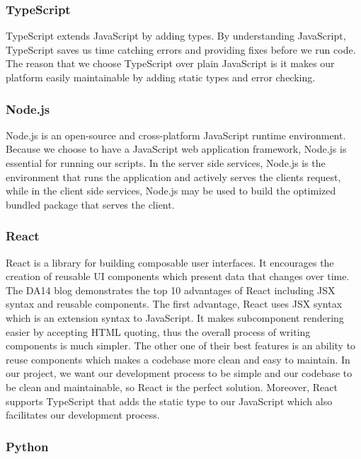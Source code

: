 \documentclass[12pt,oneside,openright,a4paper]{cpe-english-project}
\begin{document}
\subsubsection{TypeScript}

TypeScript extends JavaScript by adding types. By understanding JavaScript, TypeScript saves us time catching errors and providing fixes before we run code. \cite{TypeScript} The reason that we choose TypeScript over plain JavaScript is it makes our platform easily maintainable by adding static types and error checking.

\subsubsection{Node.js}

Node.js is an open-source and cross-platform JavaScript runtime environment. \cite{IntroductiontoNodejs} Because we choose to have a JavaScript web application framework, Node.js is essential for running our scripts. In the server side services, Node.js is the environment that runs the application and actively serves the clients request, while in the client side services, Node.js may be used to build the optimized bundled package that serves the client.

\subsubsection{React}

React is a library for building composable user interfaces. It encourages the creation of reusable UI components which present data that changes over time. \cite{WhydidwebuildReact} The DA14 blog \cite{TOP10ADVANTAGESOFUSINGREACTJS} demonstrates the top 10 advantages of React including JSX syntax and reusable components. The first advantage, React uses JSX syntax which is an extension syntax to JavaScript. It makes subcomponent rendering easier by accepting HTML quoting, thus the overall process of writing components is much simpler. The other one of their best features is an ability to reuse components which makes a codebase more clean and easy to maintain. In our project, we want our development process to be simple and our codebase to be clean and maintainable, so React is the perfect solution. Moreover, React supports TypeScript that adds the static type to our JavaScript which also facilitates our development process.

\subsubsection{Python}
\end{document}
